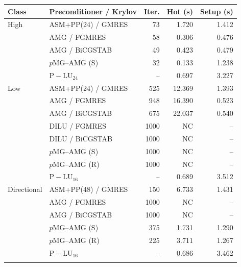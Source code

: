 \begin{tabular}{llrrr}
\toprule
Class & Preconditioner / Krylov & Iter. & Hot (s) & Setup (s) \\
\midrule
High & ASM+PP(24) / GMRES & 73 & 1.720 & 1.412 \\
 & AMG / FGMRES & 58 & 0.306 & 0.476 \\
 & AMG / BiCGSTAB & 49 & 0.423 & 0.479 \\
 & $p$MG--AMG (S) & 32 & 0.133 & 1.238 \\
 & $\mathrm{P\!-\!LU}_{24}$ & -- & 0.697 & 3.227 \\
\addlinespace[2pt]
Low & ASM+PP(24) / GMRES & 525 & 12.369 & 1.393 \\
 & AMG / FGMRES & 948 & 16.390 & 0.523 \\
 & AMG / BiCGSTAB & 675 & 22.037 & 0.540 \\
 & DILU / FGMRES & 1000 & NC & -- \\
 & DILU / BiCGSTAB & 1000 & NC & -- \\
 & $p$MG--AMG (S) & 1000 & NC & -- \\
 & $p$MG--AMG (R) & 1000 & NC & -- \\
 & $\mathrm{P\!-\!LU}_{16}$ & -- & 0.689 & 3.512 \\
\addlinespace[2pt]
Directional & ASM+PP(48) / GMRES & 150 & 6.733 & 1.431 \\
 & AMG / FGMRES & 1000 & NC & -- \\
 & AMG / BiCGSTAB & 1000 & NC & -- \\
 & $p$MG--AMG (S) & 375 & 1.731 & 1.290 \\
 & $p$MG--AMG (R) & 225 & 3.711 & 1.267 \\
 & $\mathrm{P\!-\!LU}_{16}$ & -- & 0.686 & 3.462 \\
\addlinespace[2pt]
\bottomrule
\end{tabular}

